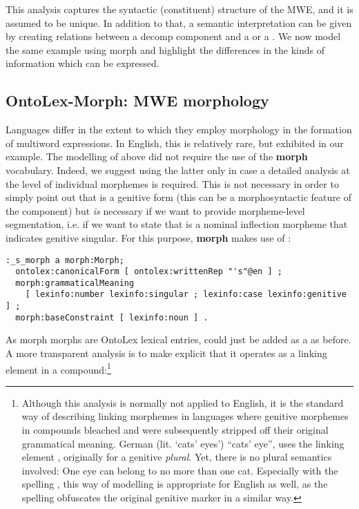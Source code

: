 \documentclass[output=paper,colorlinks,citecolor=brown]{langscibook}
\begin{document}
\noindent This analysis captures the syntactic (constituent) structure of the MWE, and it is assumed to be unique. In addition to that, a semantic interpretation can be given by creating  relations between a decomp component and a  or a .
We now model the same example using morph and highlight the differences in the kinds of information which can be expressed.

\subsection{OntoLex-Morph: MWE morphology} %
\label{section:morph_mwe}


Languages differ in the extent to which they employ morphology in the formation of multiword expressions. In English, this is relatively rare, but exhibited in our example.
The modelling of  above did not require the use of the \textbf{morph} vocabulary. Indeed, we suggest using the latter only in case a detailed analysis at the level of individual morphemes is required. This is not necessary in order to simply point out that  is a genitive form (this can be a morphosyntactic feature of the component) but \emph{is} necessary if we want to provide morpheme-level segmentation, i.e. if we want to state that  is a nominal inflection morpheme that indicates genitive singular. For this purpose, \textbf{morph} makes use of :

{\listingsize
\begin{verbatim}
:_s_morph a morph:Morph;
  ontolex:canonicalForm [ ontolex:writtenRep "'s"@en ] ;
  morph:grammaticalMeaning
    [ lexinfo:number lexinfo:singular ; lexinfo:case lexinfo:genitive ] ;
  morph:baseConstraint [ lexinfo:noun ] .
\end{verbatim}
}

\noindent
As morph morphs are OntoLex lexical entries,  could just be added as a  as before. A more transparent analysis is to make explicit that it operates as a linking element in a compound:\footnote{%
    Although this analysis is normally not applied to English, it is the standard way of describing linking morphemes in languages where genitive morphemes in compounds bleached and were subsequently stripped off their original grammatical meaning. German  (lit. `cats' eyes') ``cats' eye'', uses the linking element , originally for a genitive \emph{plural}. Yet, there is no plural semantics involved: One eye can belong to no more than one cat.
    Especially with the spelling , this way of modelling is appropriate for English as well, as the spelling obfuscates the original genitive marker in a similar way.
}
\end{document}
